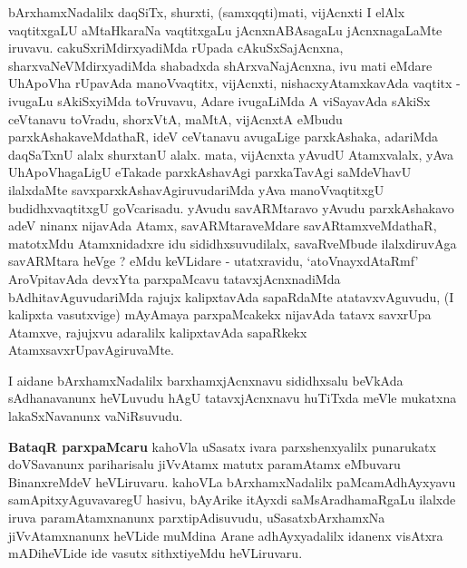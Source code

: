 \begin{artha}
bArxhamxNadalilx daqSiTx, shurxti, (samxqqti)mati, vijAcnxti I elAlx vaqtitxgaLU aMtaHkaraNa vaqtitxgaLu jAcnxnABAsagaLu jAcnxnagaLaMte iruvavu. cakuSxriMdirxyadiMda rUpada cAkuSxSajAcnxna, sharxvaNeVMdirxyadiMda shabadxda shArxvaNajAcnxna, ivu mati eMdare UhApoVha rUpavAda manoVvaqtitx, vijAcnxti, nishacxyAtamxkavAda vaqtitx - ivugaLu sAkiSxyiMda toVruvavu, Adare ivugaLiMda A viSayavAda sAkiSx ceVtanavu toVradu, shorxVtA, maMtA, vijAcnxtA eMbudu parxkAshakaveMdathaR, ideV ceVtanavu avugaLige parxkAshaka, adariMda daqSaTxnU alalx shurxtanU alalx. mata, vijAcnxta yAvudU Atamxvalalx, yAva UhApoVhagaLigU eTakade parxkAshavAgi parxkaTavAgi saMdeVhavU ilalxdaMte savxparxkAshavAgiruvudariMda yAva manoVvaqtitxgU budidhxvaqtitxgU goVcarisadu. yAvudu savARMtaravo yAvudu parxkAshakavo adeV ninanx nijavAda Atamx, savARMtaraveMdare savARtamxveMdathaR, matotxMdu Atamxnidadxre idu sididhxsuvudilalx, savaRveMbude ilalxdiruvAga savARMtara heVge ? eMdu keVLidare - utatxravidu, `atoV\s nayxdAtaRmf' AroVpitavAda devxYta parxpaMcavu tatavxjAcnxnadiMda bAdhitavAguvudariMda rajujx kalipxtavAda sapaRdaMte atatavxvAguvudu, (I kalipxta vasutxvige) mAyAmaya parxpaMcakekx nijavAda tatavx savxrUpa Atamxve, rajujxvu adaralilx kalipxtavAda sapaRkekx AtamxsavxrUpavAgiruvaMte. 
\end{artha}


\begin{artha}
I aidane bArxhamxNadalilx barxhamxjAcnxnavu sididhxsalu beVkAda sAdhanavanunx heVLuvudu hAgU tatavxjAcnxnavu huTiTxda meVle mukatxna lakaSxNavanunx vaNiRsuvudu.
\end{artha}


\begin{artha}
{\bf BataqR parxpaMcaru} kahoVla uSasatx ivara parxshenxyalilx punarukatx doVSavanunx pariharisalu jiVvAtamx matutx paramAtamx eMbuvaru BinanxreMdeV heVLiruvaru. kahoVLa bArxhamxNadalilx paMcamAdhAyxyavu samApitxyAguvavaregU hasivu,  bAyArike itAyxdi saMsAradhamaRgaLu ilalxde iruva paramAtamxnanunx parxtipAdisuvudu, uSasatxbArxhamxNa jiVvAtamxnanunx heVLide muMdina Arane adhAyxyadalilx idanenx visAtxra mADiheVLide ide vasutx sithxtiyeMdu heVLiruvaru.
\end{artha}


